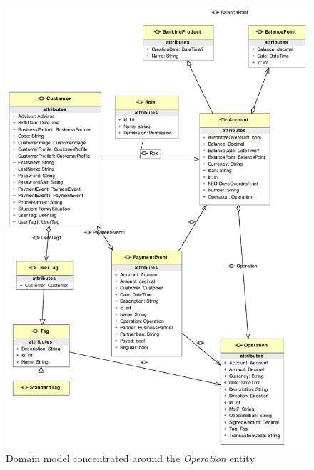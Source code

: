 \documentclass[11pt,twoside,a4paper]{book}
\begin{document}
\begin{figure}[h]
\begin{center}
\includegraphics[width=14cm]{figures/operation_oriented}
\caption{Domain model concentrated around the \textit{Operation} entity}
\label{fig:domain_model_2}
\end{center}
\end{figure}
\end{document}
